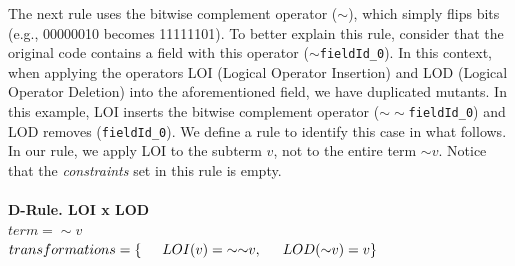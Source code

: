 The next rule uses the bitwise complement operator ($\sim$), which simply flips bits (e.g., 00000010 becomes 11111101). To better explain this rule, consider that the original code contains a field with this operator (\texttt{$\sim$fieldId\_0}). In this context, when applying the \mujava{} operators LOI (Logical Operator Insertion) and LOD (Logical Operator Deletion) into the aforementioned field, we have duplicated mutants. In this example, LOI inserts the bitwise complement operator (\texttt{$\sim\sim$fieldId\_0}) and LOD removes (\texttt{fieldId\_0}). We define a rule to identify this case in what follows. In our rule, we apply LOI to the subterm $v$, not to the entire term $\sim$$v$. Notice that the \textit{constraints} set in this rule is empty.
\\
\\
\textbf{D-Rule. LOI x LOD}\\
$term = {\sim}v$\\
$transformations = \{\\ \indent LOI(v) = {\sim\sim} v,\\ \indent LOD({\sim}v) = v \\\}$\\

